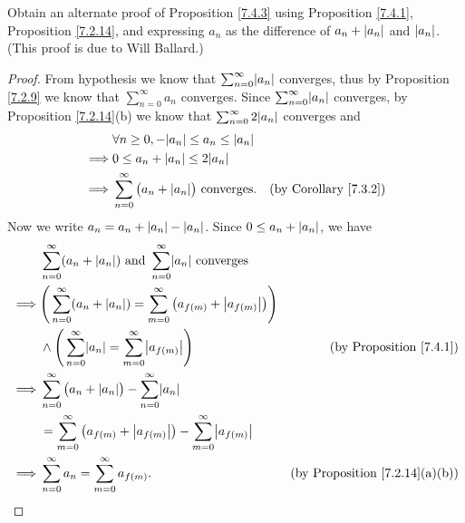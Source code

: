 \begin{exercise}\label{ex 7.4.2}
    Obtain an alternate proof of Proposition \ref{7.4.3} using Proposition \ref{7.4.1}, Proposition \ref{7.2.14}, and expressing \(a_n\) as the difference of \(a_n + \left\lvert a_n\right\rvert\) and \(\left\lvert a_n\right\rvert\).
    (This proof is due to Will Ballard.)
\end{exercise}

\begin{proof}
    From hypothesis we know that \(\sum_{n = 0}^\infty \abs{a_n}\) converges, thus by Proposition \ref{7.2.9} we know that \(\sum_{n = 0}^\infty a_n\) converges.
    Since \(\sum_{n = 0}^\infty \abs{a_n}\) converges, by Proposition \ref{7.2.14}(b) we know that \(\sum_{n = 0}^\infty 2 \abs{a_n}\) converges and
    \begin{align*}
                 & \forall n \geq 0, -\abs{a_n} \leq a_n \leq \abs{a_n}                                                 \\
        \implies & 0 \leq a_n + \abs{a_n} \leq 2\abs{a_n}                                                               \\
        \implies & \sum_{n = 0}^\infty \big(a_n + \abs{a_n}\big) \text{ converges}. & \text{(by Corollary \ref{7.3.2})}
    \end{align*}
    Now we write \(a_n = a_n + \left\lvert a_n\right\rvert - \left\lvert a_n\right\rvert\).
    Since \(0 \leq a_n + \left\lvert a_n\right\rvert\), we have
    \begin{align*}
                 & \sum_{n = 0}^\infty (a_n + \abs{a_n}) \text{ and } \sum_{n = 0}^\infty \abs{a_n} \text{ converges}                                                       \\
        \implies & \Bigg(\sum_{n = 0}^\infty (a_n + \abs{a_n}) = \sum_{m = 0}^\infty \big(a_{f(m)} + \abs{a_{f(m)}}\big)\Bigg)                                              \\
                 & \land \Bigg(\sum_{n = 0}^\infty \abs{a_n} = \sum_{m = 0}^\infty \abs{a_{f(m)}}\Bigg)                        & \text{(by Proposition \ref{7.4.1})}        \\
        \implies & \sum_{n = 0}^\infty \big(a_n + \abs{a_n}\big) - \sum_{n = 0}^\infty \abs{a_n}                                                                            \\
                 & = \sum_{m = 0}^\infty \big(a_{f(m)} + \abs{a_{f(m)}}\big) - \sum_{m = 0}^\infty \abs{a_{f(m)}}                                                           \\
        \implies & \sum_{n = 0}^\infty a_n = \sum_{m = 0}^\infty a_{f(m)}.                                                     & \text{(by Proposition \ref{7.2.14}(a)(b))}
    \end{align*}
\end{proof}